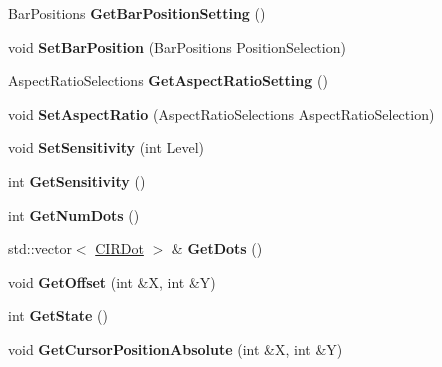 \begin{DoxyCompactItemize}
\item 
\hypertarget{class_c_i_r_a4a503687457f634fc6c856f2e77c06f5}{Bar\-Positions {\bfseries Get\-Bar\-Position\-Setting} ()}\label{class_c_i_r_a4a503687457f634fc6c856f2e77c06f5}

\item 
\hypertarget{class_c_i_r_a2f53ec4a1467018e7f87e7656e41b973}{void {\bfseries Set\-Bar\-Position} (Bar\-Positions Position\-Selection)}\label{class_c_i_r_a2f53ec4a1467018e7f87e7656e41b973}

\item 
\hypertarget{class_c_i_r_a91c86ac63664923f1d9e8349090305ba}{Aspect\-Ratio\-Selections {\bfseries Get\-Aspect\-Ratio\-Setting} ()}\label{class_c_i_r_a91c86ac63664923f1d9e8349090305ba}

\item 
\hypertarget{class_c_i_r_a086af52543a75cdba5434a57b1846edb}{void {\bfseries Set\-Aspect\-Ratio} (Aspect\-Ratio\-Selections Aspect\-Ratio\-Selection)}\label{class_c_i_r_a086af52543a75cdba5434a57b1846edb}

\item 
\hypertarget{class_c_i_r_a4144e2d3d037de5cd2da3d53d11f1a83}{void {\bfseries Set\-Sensitivity} (int Level)}\label{class_c_i_r_a4144e2d3d037de5cd2da3d53d11f1a83}

\item 
\hypertarget{class_c_i_r_a2898d4e3967661a04b93246f4dda4a40}{int {\bfseries Get\-Sensitivity} ()}\label{class_c_i_r_a2898d4e3967661a04b93246f4dda4a40}

\item 
\hypertarget{class_c_i_r_a76afd635873b098e0cd6c8b9bcab9587}{int {\bfseries Get\-Num\-Dots} ()}\label{class_c_i_r_a76afd635873b098e0cd6c8b9bcab9587}

\item 
\hypertarget{class_c_i_r_afd0f42f03533f56f9516e6521cdbe738}{std\-::vector$<$ \hyperlink{class_c_i_r_dot}{C\-I\-R\-Dot} $>$ \& {\bfseries Get\-Dots} ()}\label{class_c_i_r_afd0f42f03533f56f9516e6521cdbe738}

\item 
\hypertarget{class_c_i_r_aeb23613d64e95e7e7fff717c83f68377}{void {\bfseries Get\-Offset} (int \&X, int \&Y)}\label{class_c_i_r_aeb23613d64e95e7e7fff717c83f68377}

\item 
\hypertarget{class_c_i_r_aee4bc6e44ee5903b2c45cc46bf5be361}{int {\bfseries Get\-State} ()}\label{class_c_i_r_aee4bc6e44ee5903b2c45cc46bf5be361}

\item 
\hypertarget{class_c_i_r_a573324907a9082fe70d65b419ed83a5e}{void {\bfseries Get\-Cursor\-Position\-Absolute} (int \&X, int \&Y)}\label{class_c_i_r_a573324907a9082fe70d65b419ed83a5e}


\end{DoxyCompactItemize}
